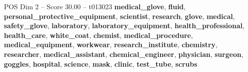 \begin{textsample}{POS Dim 2 – Score 30.00 – t013023}  \label{ex:f2_pos_008}
\textbf{medical\_glove}, \textbf{fluid}, \textbf{personal\_protective\_equipment}, \textbf{scientist}, \textbf{research}, \textbf{glove}, \textbf{medical}, \textbf{safety\_glove}, \textbf{laboratory}, \textbf{laboratory\_equipment}, \textbf{health\_professional}, \textbf{health\_care}, \textbf{white\_coat}, \textbf{chemist}, \textbf{medical\_procedure}, \textbf{medical\_equipment}, \textbf{workwear}, \textbf{research\_institute}, \textbf{chemistry}, \textbf{researcher}, \textbf{medical\_assistant}, \textbf{chemical\_engineer}, \textbf{physician}, \textbf{surgeon}, \textbf{goggles}, \textbf{hospital}, \textbf{science}, \textbf{mask}, \textbf{clinic}, \textbf{test\_tube}, \textbf{scrubs}

\end{textsample}
